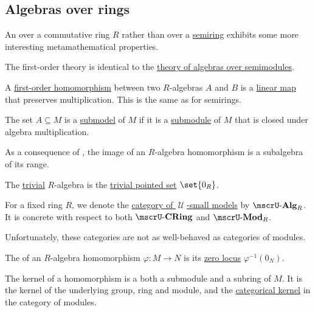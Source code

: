 \subsection{Algebras over rings}\label{subsec:algebras_over_rings}

\begin{definition}\label{def:algebra_over_ring}
  An  over a commutative ring \( R \) rather than over a \hyperref[def:algebra_over_semiring]{semiring} exhibits some more interesting metamathematical properties.

  \begin{thmenum}
     The first-order theory is identical to the \hyperref[def:agebra_over_semiring/theory]{theory of algebras over semimodules}.

     A \hyperref[def:first_order_homomorphism]{first-order homomorphism} between two \( R \)-algebras \( A \) and \( B \) is a \hyperref[def:semimodule/homomorphism]{linear map} that preserves multiplication. This is the same as for semirings.

     The set \( A \subseteq M \) is a \hyperref[thm:substructure_is_model]{submodel} of \( M \) if it is a \hyperref[def:monoid/submodel]{submodule} of \( M \) that is closed under algebra multiplication.

    As a consequence of , the image of an \( R \)-algebra homomorphism is a subalgebra of its range.

     The \hyperref[thm:substructures_form_complete_lattice/bottom]{trivial} \( R \)-algebra is the \hyperref[def:pointed_set/trivial]{trivial pointed set} \( \set{ 0_R } \).

     For a fixed ring \( R \), we denote the \hyperref[def:category_of_small_first_order_models]{category of \( \mscrU \)-small models} by \( \ucat{Alg}_R \). It is concrete with respect to both \( \ucat{CRing} \) and \( \ucat{Mod}_R \).

    Unfortunately, these categories are not as well-behaved as categories of modules.

     The  of an \( R \)-algebra homomorphism \( \varphi: M \to N \) is its \hyperref[def:zero_locus]{zero locus} \( \varphi^{-1}(0_N) \).

    The kernel of a homomorphism is a both a submodule and a subring of \( M \). It is the kernel of the underlying group, ring and module, and the \hyperref[def:zero_morphisms/cokernel]{categorical kernel} in the category of modules.


\end{thmenum}
\end{definition}

